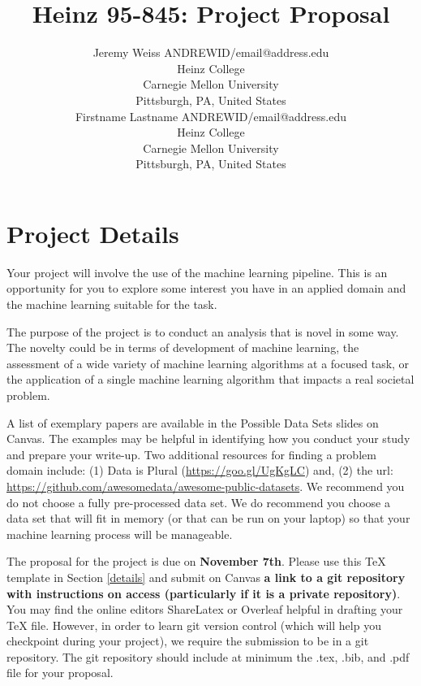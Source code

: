 \documentclass[twoside,11pt]{article}
\begin{document}
\title{Heinz 95-845: Project Proposal}

\author{\name Jeremy Weiss \email ANDREWID/email@address.edu \\
       \addr Heinz College\\
       Carnegie Mellon University\\
       Pittsburgh, PA, United States \\
       \AND
       \name Firstname Lastname \email ANDREWID/email@address.edu \\
       \addr Heinz College\\
       Carnegie Mellon University\\
       Pittsburgh, PA, United States}
\maketitle


\section{Project Details}
Your project will involve the use of the machine learning pipeline. This is an opportunity for you to explore some interest you have in an applied domain and the machine learning suitable for the task.

The purpose of the project is to conduct an analysis that is novel in some way. The novelty could be in terms of development of machine learning, the assessment of a wide variety of machine learning algorithms at a focused task, or the application of a single machine learning algorithm that impacts a real societal problem.

A list of exemplary papers are available in the Possible Data Sets slides on Canvas. The examples may be helpful in identifying how you conduct your study and prepare your write-up. Two additional resources for finding a problem domain include: (1) Data is Plural (\url{https://goo.gl/UgKgLC}) and, (2) the url: \url{https://github.com/awesomedata/awesome-public-datasets}. We recommend you do not choose a fully pre-processed data set. We do recommend you choose a data set that will fit in memory (or that can be run on your laptop) so that your machine learning process will be manageable.

The proposal for the project is due on \textbf{November 7th}. Please use this TeX template in Section \ref{details} and submit on Canvas \textbf{a link to a git repository with instructions on access (particularly if it is a private repository)}. You may find the online editors ShareLatex or Overleaf helpful in drafting your TeX file. However, in order to learn git version control (which will help you checkpoint during your project), we require the submission to be in a git repository. The git repository should include at minimum the .tex, .bib, and .pdf file for your proposal.
\end{document}
